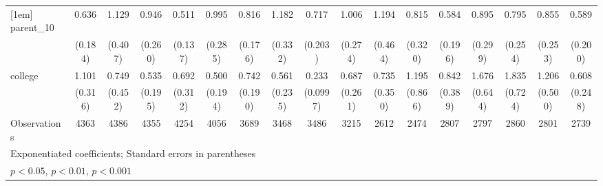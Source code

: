 {\begin{tabular}{l*{16}{c}}
[1em]
parent\_10           &       0.636         &       1.129         &       0.946         &       0.511\sym{*}  &       0.995         &       0.816         &       1.182         &       0.717         &       1.006         &       1.194         &       0.815         &       0.584         &       0.895         &       0.795         &       0.855         &       0.589         \\
                    &     (0.184)         &     (0.407)         &     (0.260)         &     (0.137)         &     (0.285)         &     (0.176)         &     (0.332)         &     (0.203)         &     (0.274)         &     (0.464)         &     (0.320)         &     (0.196)         &     (0.299)         &     (0.254)         &     (0.253)         &     (0.200)         \\
[1em]
college             &       1.101         &       0.749         &       0.535         &       0.692         &       0.500         &       0.742         &       0.561         &       0.233\sym{***}&       0.687         &       0.735         &       1.195         &       0.842         &       1.676         &       1.835         &       1.206         &       0.608         \\
                    &     (0.316)         &     (0.452)         &     (0.195)         &     (0.312)         &     (0.194)         &     (0.190)         &     (0.235)         &    (0.0997)         &     (0.261)         &     (0.350)         &     (0.866)         &     (0.389)         &     (0.644)         &     (0.724)         &     (0.500)         &     (0.248)         \\
\hline
Observations        &        4363         &        4386         &        4355         &        4254         &        4056         &        3689         &        3468         &        3486         &        3215         &        2612         &        2474         &        2807         &        2797         &        2860         &        2801         &        2739         \\
\hline\hline
\multicolumn{17}{l}{\footnotesize Exponentiated coefficients; Standard errors in parentheses}\\
\multicolumn{17}{l}{\footnotesize \sym{*} \(p<0.05\), \sym{**} \(p<0.01\), \sym{***} \(p<0.001\)}\\
\end{tabular}
}
